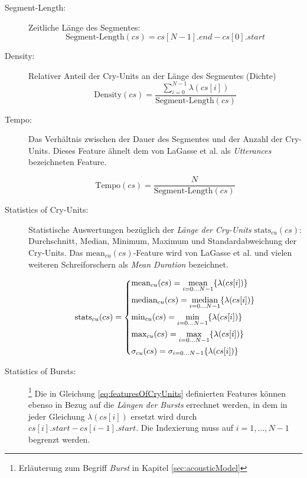 \begin{description}
\item[Segment-Length: ] Zeitliche Länge des Segmentes:
\begin{equation}
\text{Segment-Length}(cs) = cs[N-1].end - cs[0].start
\label{eq:segment_length}
\end{equation}

\item[Density: ] Relativer Anteil der Cry-Units an der Länge des Segmentes (\glqq Dichte\grqq{})
\begin{equation}
\text{Density}(cs) = \frac{\sum_{i = 0}^{N-1} \lambda(cs[i])}{\text{Segment-Length}(cs)}
\end{equation}

\item[Tempo:] Das Verhältnis zwischen der Dauer des Segmentes und der Anzahl der Cry-Units. Dieses Feature ähnelt dem von LaGasse et al. \cite[S. 85]{parentalPerception} als \emph{Utterances} bezeichneten Feature.

\begin{equation}
\text{Tempo}(cs) =  \frac{N}{\text{Segment-Length}(cs)}
\end{equation}

\item[Statistics of Cry-Units:] Statistische Auswertungen bezüglich der \emph{Länge der Cry-Units} $\text{stats}_{cu}(cs)$: Durchschnitt, Median, Minimum, Maximum und Standardabweichung der Cry-Units. Das $\text{mean}_{cu}(cs)$-Feature wird von LaGasse et al. \cite[S. 85]{parentalPerception} und vielen weiteren Schreiforschern als \emph{Mean Duration} bezeichnet.

\begin{equation}
\text{stats}_{cu}(cs) = 
\begin{dcases}
\text{mean}_{cu}(cs) = \operatorname*{mean}_{i = 0 \ldots N-1}\{\lambda(cs[i])\} \\
\text{median}_{cu}(cs) = \operatorname*{median}_{i = 0 \ldots N-1}\{\lambda(cs[i])\} \\
\text{min}_{cu}(cs) = \operatorname*{min}_{i = 0 \ldots N-1}\{\lambda(cs[i])\} \\
\text{max}_{cu}(cs) = \operatorname*{max}_{i = 0 \ldots N-1}\{\lambda(cs[i])\} \\
\sigma_{cu}(cs) =  \sigma_{i = 0 \ldots N-1}\{\lambda(cs[i])\} 
\end{dcases}
\label{eq:featuresOfCryUnits}
\end{equation}

\item[Statistics of Bursts:]\footnote{Erläuterung zum Begriff \emph{Burst} in Kapitel \ref{sec:acousticModel}} Die in Gleichung \ref{eq:featuresOfCryUnits} definierten Features können ebenso in Bezug auf die \emph{Längen der Bursts} errechnet werden, in dem in jeder Gleichung $\lambda(cs[i])$ ersetzt wird durch $cs[i].start - cs[i-1].start$. Die Indexierung muss auf $i = 1 ,\ldots, N-1$ begrenzt werden.


\end{description}
